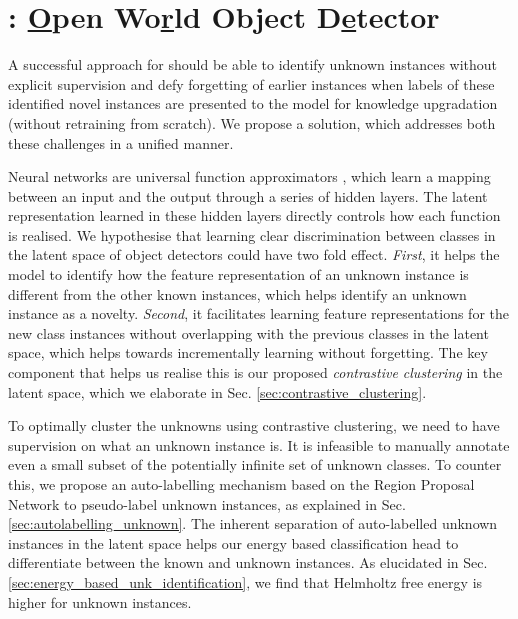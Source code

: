 \documentclass[final]{cvpr}
\begin{document}
\section{\method: \underline{O}pen Wo\underline{r}ld Object D\underline{e}tector}\label{sec:ore_methodology}
A successful approach for \OWOD should be able to identify unknown instances without explicit supervision and defy forgetting of earlier instances  when labels of these identified novel instances are presented to the model for knowledge upgradation (without retraining from scratch). We propose a solution, \method which addresses both these challenges in a unified manner. 

Neural networks are universal function approximators \cite{hornik1989multilayer}, which learn a mapping between an input and the output through a series of hidden layers. The latent representation learned in these hidden layers directly controls how each function is realised. We hypothesise that learning clear discrimination between classes in the latent space of object detectors could have two fold effect. \emph{First}, it helps the model to identify how the feature representation of an unknown instance is different from the other known instances, which helps identify an unknown instance as a novelty. \emph{Second}, it facilitates learning feature representations for the new class instances without overlapping with the previous classes in the latent space, which helps towards incrementally learning without forgetting. 
The key component that helps us realise this is our proposed \textit{contrastive clustering} in the latent space, which we elaborate in Sec. \ref{sec:contrastive_clustering}.

To optimally cluster the unknowns using contrastive clustering, we need to have supervision on what an unknown instance is. It is infeasible to manually annotate even a small subset of the potentially infinite set of unknown classes. To counter this, we propose an auto-labelling mechanism based on the Region Proposal Network \cite{ren2015faster} to pseudo-label unknown instances, as explained in Sec. \ref{sec:autolabelling_unknown}. 
The inherent separation of auto-labelled unknown instances in the latent space helps our energy based classification head to differentiate between the known and unknown instances. As elucidated in Sec. \ref{sec:energy_based_unk_identification}, we find that Helmholtz free energy is higher for unknown instances.
\end{document}
